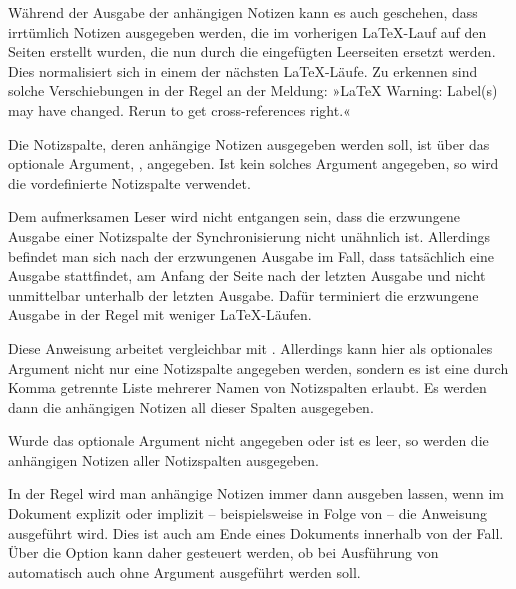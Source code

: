 Während der Ausgabe der anhängigen Notizen kann es auch geschehen, dass
irrtümlich Notizen ausgegeben werden, die im
vorherigen \LaTeX-Lauf auf den Seiten erstellt wurden, die nun durch die
eingefügten Leerseiten ersetzt werden. Dies normalisiert sich in einem der
nächsten \LaTeX-Läufe. Zu erkennen sind solche Verschiebungen in der Regel an
der Meldung: »\LaTeX{} Warning: Label(s) may have changed. Rerun to get
cross-references right.«

Die Notizspalte, deren anhängige Notizen ausgegeben werden soll, ist über das
optionale Argument, , angegeben. Ist kein solches
Argument angegeben, so wird die vordefinierte Notizspalte 
verwendet.

Dem aufmerksamen Leser wird nicht entgangen sein, dass die
erzwungene Ausgabe einer
Notizspalte der Synchronisierung nicht unähnlich ist. Allerdings befindet man
sich nach der erzwungenen Ausgabe im Fall, dass tatsächlich eine Ausgabe
stattfindet, am Anfang der Seite nach der letzten Ausgabe und nicht
unmittelbar unterhalb der letzten Ausgabe. Dafür terminiert die erzwungene
Ausgabe in der Regel mit weniger \LaTeX-Läufen.%
\EndIndexGroup


\begin{Declaration}
\end{Declaration}
Diese Anweisung arbeitet vergleichbar mit
. Allerdings kann hier als optionales
Argument nicht nur eine Notizspalte angegeben werden, sondern es ist eine
durch Komma getrennte Liste mehrerer Namen von Notizspalten erlaubt. Es werden
dann die anhängigen Notizen all dieser Spalten ausgegeben.

Wurde das optionale Argument nicht angegeben oder ist es leer, so werden die
anhängigen Notizen aller Notizspalten ausgegeben.%
\EndIndexGroup


\begin{Declaration}
\end{Declaration}
In der Regel wird man anhängige Notizen immer dann ausgeben lassen, wenn im
Dokument explizit oder implizit -- beispielsweise in Folge von
 -- die Anweisung 
ausgeführt wird. Dies ist auch am Ende eines Dokuments innerhalb von
 der Fall. Über die Option
 kann daher gesteuert werden, ob bei Ausführung
von  automatisch auch
 ohne Argument ausgeführt werden
soll.

